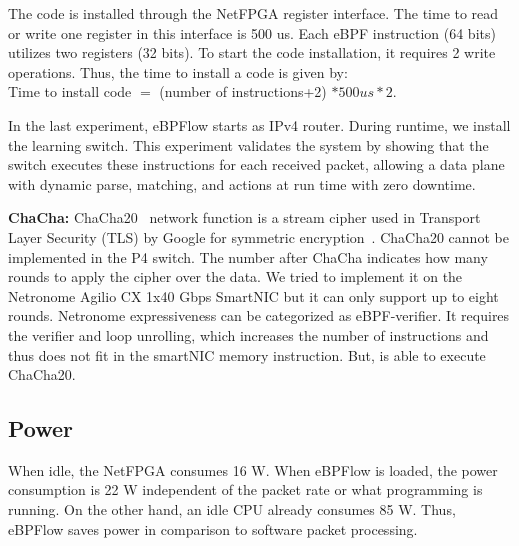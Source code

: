 The code is installed through the NetFPGA register interface.
The time to read or write one register in this interface is 500 us.
Each eBPF instruction (64 bits) utilizes two registers (32 bits).
To start the code installation, it requires 2 write operations.
Thus, the time to install a code is given by:\\
Time to install code $=$ (number of instructions+2) $* 500 us * 2.$ 

In the last experiment, eBPFlow starts as IPv4 router. During runtime, we install the learning switch. This experiment validates the system by showing that the switch executes these instructions for each received packet, allowing a data plane with dynamic parse, matching, and actions at run time with zero downtime.

\textbf{ChaCha:} 
ChaCha20~\cite{rfc8439} network function is a
stream cipher used in Transport Layer Security (TLS) by Google for symmetric
encryption~\cite{google-chacha}.
ChaCha20 cannot be implemented in the P4 switch.
The number after ChaCha indicates how many rounds to apply the cipher over the data.
We tried to implement it on the Netronome Agilio CX 1x40 Gbps SmartNIC but it can only support up to eight rounds. Netronome expressiveness can be categorized as eBPF-verifier. It requires the verifier and loop unrolling, which increases the number of instructions and thus does not fit in the smartNIC memory instruction.
But, \system is able to execute ChaCha20.




\subsection{Power}

When idle, the NetFPGA consumes 16 W.
When eBPFlow is loaded, the power consumption is 22 W independent of the packet rate or what programming is running.
On the other hand, an idle CPU already consumes 85 W.
Thus, eBPFlow saves power in comparison to software packet processing.


